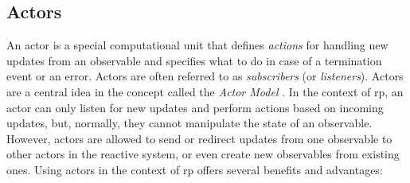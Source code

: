 \subsection{Actors}

An actor is a special computational unit that defines \textit{actions} for handling new
updates from an observable and specifies what to do in case of a termination event or an error.
Actors are often referred to as \textit{subscribers} (or \textit{listeners}). Actors are a central idea in the concept called the \textit{Actor Model} \citep{hewitt_actor_model}.
In the context of \ac{rp}, an actor can only listen for new updates and perform actions based on incoming updates, but, normally, they cannot manipulate the state of an observable.
However, actors are allowed to send or redirect updates from one observable to other actors in
the reactive system, or even create new observables from existing ones.
Using actors in the context of \ac{rp} offers several benefits and advantages:
